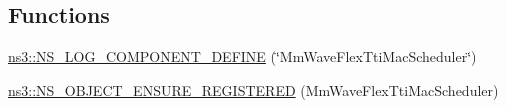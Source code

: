 \subsection*{Functions}
\begin{DoxyCompactItemize}
\item 
\hyperlink{namespacens3_a9ce0971dcd2873f61d6966070aa4d166}{ns3\+::\+N\+S\+\_\+\+L\+O\+G\+\_\+\+C\+O\+M\+P\+O\+N\+E\+N\+T\+\_\+\+D\+E\+F\+I\+NE} (\char`\"{}Mm\+Wave\+Flex\+Tti\+Mac\+Scheduler\char`\"{})
\item 
\hyperlink{namespacens3_adf542e7edf51eae21b2b4c6cefbe81c9}{ns3\+::\+N\+S\+\_\+\+O\+B\+J\+E\+C\+T\+\_\+\+E\+N\+S\+U\+R\+E\+\_\+\+R\+E\+G\+I\+S\+T\+E\+R\+ED} (Mm\+Wave\+Flex\+Tti\+Mac\+Scheduler)
\end{DoxyCompactItemize}
